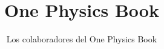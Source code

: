 \documentclass[11pt,a4paper,twoside,openany]{book}
\title{One Physics Book}
\author{Los colaboradores del One Physics Book}
\date{\bookdate}
\begin{document}
\frontmatter



\tableofcontents

\mainmatter





\appendix
\part{\omsolutionspart}




\backmatter
\printindex
\end{document}
